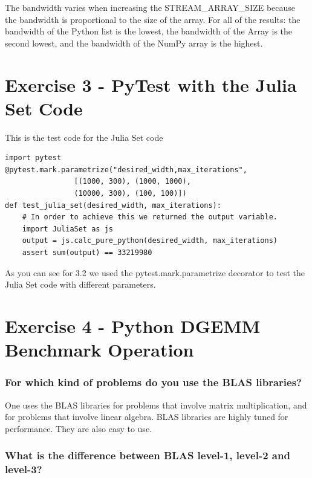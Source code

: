 \documentclass{article}
\begin{document}
The bandwidth varies when increasing the STREAM\_ARRAY\_SIZE because the bandwidth is proportional to the size of the array.
For all of the results: the bandwidth of the Python list is the lowest, the bandwidth of the Array is the second lowest, and the bandwidth of the NumPy array is the highest.

\section{Exercise 3 - PyTest with the Julia Set Code}

This is the test code for the Julia Set code


\begin{minipage}{\linewidth}
\begin{lstlisting}
import pytest
@pytest.mark.parametrize("desired_width,max_iterations",
                [(1000, 300), (1000, 1000),
                (10000, 300), (100, 100)])
def test_julia_set(desired_width, max_iterations):
    # In order to achieve this we returned the output variable.
    import JuliaSet as js
    output = js.calc_pure_python(desired_width, max_iterations)
    assert sum(output) == 33219980
\end{lstlisting}
\end{minipage}
As you can see for 3.2 we used the pytest.mark.parametrize decorator to test the Julia Set code with different parameters.


\section{Exercise 4 - Python DGEMM Benchmark Operation}

\subsubsection{For which kind of problems do you use the BLAS libraries?}

One uses the BLAS libraries for problems that involve matrix multiplication, and for problems that involve linear algebra.
BLAS libraries are highly tuned for performance. 
They are also easy to use.

\subsubsection{What is the difference between BLAS level-1, level-2 and level-3?}
\end{document}
